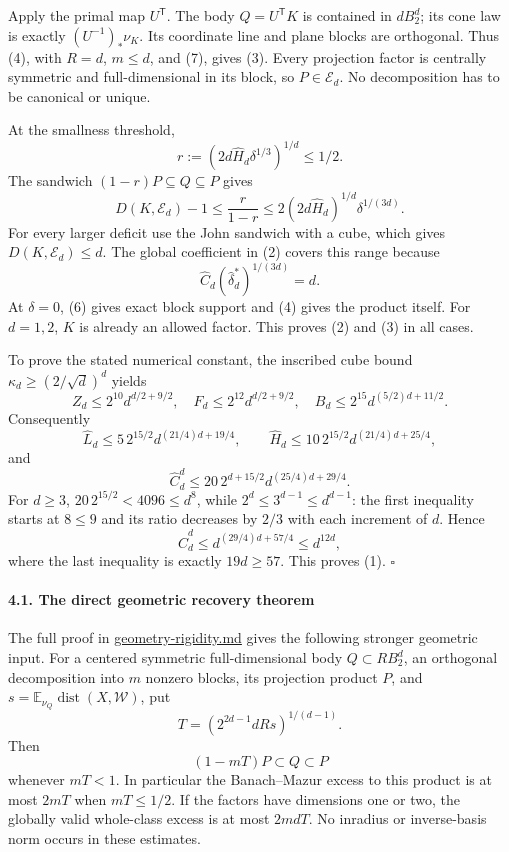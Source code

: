 \documentclass[
  11pt,
]{article}
\begin{document}
Apply the primal map \(U^{\mathsf T}\). The body \(Q=U^{\mathsf T}K\) is
contained in \(dB_2^d\); its cone law is exactly \((U^{-1})_*\nu_K\).
Its coordinate line and plane blocks are orthogonal. Thus (4), with
\(R=d\), \(m\le d\), and (7), gives (3). Every projection factor is
centrally symmetric and full-dimensional in its block, so
\(P\in\mathcal E_d\). No decomposition has to be canonical or unique.

At the smallness threshold, \[
r:=(2d\widehat H_d\delta^{1/3})^{1/d}\le1/2.
\] The sandwich \((1-r)P\subseteq Q\subseteq P\) gives \[
D(K,\mathcal E_d)-1\le\frac r{1-r}
\le2(2d\widehat H_d)^{1/d}\delta^{1/(3d)}.
\] For every larger deficit use the John sandwich with a cube, which
gives \(D(K,\mathcal E_d)\le d\). The global coefficient in (2) covers
this range because \[
\widehat C_d(\widehat\delta_d^*)^{1/(3d)}=d.
\] At \(\delta=0\), (6) gives exact block support and (4) gives the
product itself. For \(d=1,2\), \(K\) is already an allowed factor. This
proves (2) and (3) in all cases.

To prove the stated numerical constant, the inscribed cube bound
\(\kappa_d\ge(2/\sqrt d)^d\) yields \[
Z_d\le2^{10}d^{d/2+9/2},\quad
F_d\le2^{12}d^{d/2+9/2},\quad
B_d\le2^{15}d^{(5/2)d+11/2}.
\] Consequently \[
\widehat L_d\le5\,2^{15/2}d^{(21/4)d+19/4},\qquad
\widehat H_d\le10\,2^{15/2}d^{(21/4)d+25/4},
\] and \[
\widehat C_d^d
\le20\,2^{d+15/2}d^{(25/4)d+29/4}.
\] For \(d\ge3\), \(20\,2^{15/2}<4096\le d^8\), while
\(2^d\le3^{d-1}\le d^{d-1}\): the first inequality starts at \(8\le9\)
and its ratio decreases by \(2/3\) with each increment of \(d\). Hence
\[
\widehat C_d^d\le d^{(29/4)d+57/4}\le d^{12d},
\] where the last inequality is exactly \(19d\ge57\). This proves (1).
\(\square\)

\paragraph{4.1. The direct geometric recovery
theorem}\label{the-direct-geometric-recovery-theorem}

The full proof in \url{geometry-rigidity.md} gives the following
stronger geometric input. For a centered symmetric full-dimensional body
\(Q\subset RB_2^d\), an orthogonal decomposition into \(m\) nonzero
blocks, its projection product \(P\), and
\(s=\mathbb E_{\nu_Q}\operatorname{dist}(X,\mathcal W)\), put \[
T=(2^{2d-1}dR s)^{1/(d-1)}.
\] Then \[
(1-mT)P\subset Q\subset P                                  \tag{9}
\] whenever \(mT<1\). In particular the Banach--Mazur excess to this
product is at most \(2mT\) when \(mT\le1/2\). If the factors have
dimensions one or two, the globally valid whole-class excess is at most
\(2mdT\). No inradius or inverse-basis norm occurs in these estimates.
\end{document}
